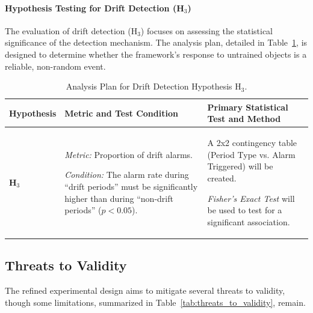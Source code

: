 \paragraph{Hypothesis Testing for Drift Detection (H$_3$)}
The evaluation of drift detection (H$_3$) focuses on assessing the statistical significance of the detection mechanism. The analysis plan, detailed in Table~\ref{tab:analysis_plan_h3}, is designed to determine whether the framework's response to untrained objects is a reliable, non-random event.

\begin{table}[htbp]
    \caption{Analysis Plan for Drift Detection Hypothesis H$_3$.}
    \label{tab:analysis_plan_h3}
    \begin{tabularx}{\linewidth}{@{}>{\raggedright\arraybackslash}p{} >{\raggedright\arraybackslash}X >{\raggedright\arraybackslash}p{}@{}}
        \toprule
        \textbf{Hypothesis} & \textbf{Metric and Test Condition} & \textbf{Primary Statistical Test and Method} \\
        \midrule
        \textbf{H$_3$} & 
        \textit{Metric:} Proportion of drift alarms.
        
        \textit{Condition:} The alarm rate during ``drift periods'' must be significantly higher than during ``non-drift periods'' ($p < 0.05$). &
        A 2x2 contingency table (Period Type vs. Alarm Triggered) will be created. 
        
        \textit{Fisher's Exact Test} will be used to test for a significant association. \\
        \bottomrule
    \end{tabularx}
\end{table}

\subsection{Threats to Validity}
\label{ssec:evaluation_threats_to_validity}

The refined experimental design aims to mitigate several threats to validity, though some limitations, summarized in Table~\ref{tab:threats_to_validity}, remain.

